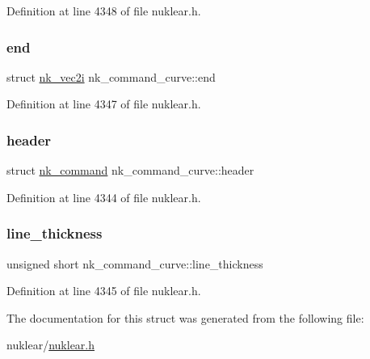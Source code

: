 Definition at line 4348 of file nuklear.\+h.

\mbox{\label{structnk__command__curve_aa69e2aea76ec8cadbf55fd27557d6582}} 
\subsubsection{\texorpdfstring{end}{end}}
{\footnotesize\ttfamily struct \mbox{\hyperlink{structnk__vec2i}{nk\+\_\+vec2i}} nk\+\_\+command\+\_\+curve\+::end}



Definition at line 4347 of file nuklear.\+h.

\mbox{\label{structnk__command__curve_a4a83c7e8c5ba8b4340238f9a7401461d}} 
\subsubsection{\texorpdfstring{header}{header}}
{\footnotesize\ttfamily struct \mbox{\hyperlink{structnk__command}{nk\+\_\+command}} nk\+\_\+command\+\_\+curve\+::header}



Definition at line 4344 of file nuklear.\+h.

\mbox{\label{structnk__command__curve_ae780aa8003d662d9873cba9527b0a02c}} 
\subsubsection{\texorpdfstring{line\+\_\+thickness}{line\_thickness}}
{\footnotesize\ttfamily unsigned short nk\+\_\+command\+\_\+curve\+::line\+\_\+thickness}



Definition at line 4345 of file nuklear.\+h.



The documentation for this struct was generated from the following file\+:\begin{DoxyCompactItemize}
\item 
nuklear/\mbox{\hyperlink{nuklear_8h}{nuklear.\+h}}\end{DoxyCompactItemize}
